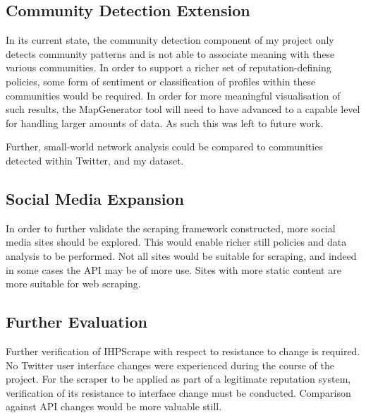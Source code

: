 \subsection{Community Detection Extension}

In its current state, the community detection component of my project only detects community patterns and is not able to associate meaning with these various communities. In order to support a richer set of reputation-defining policies, some form of sentiment or classification of profiles within these communities would be required. In order for more meaningful visualisation of such results, the MapGenerator tool will need to have advanced to a capable level for handling larger amounts of data. As such this was left to future work.

Further, small-world network analysis could be compared to communities detected within Twitter, and my dataset. 

\subsection{Social Media Expansion}

In order to further validate the scraping framework constructed, more social media sites should be explored. This would enable richer still policies and data analysis to be performed. Not all sites would be suitable for scraping, and indeed in some cases the API may be of more use. Sites with more static content are more suitable for web scraping. 




\subsection{Further Evaluation}

Further verification of IHPScrape with respect to resistance to change is required. No Twitter user interface changes were experienced during the course of the project. For the scraper to be applied as part of a legitimate reputation system, verification of its resistance to interface change must be conducted. Comparison against API changes would be more valuable still.

